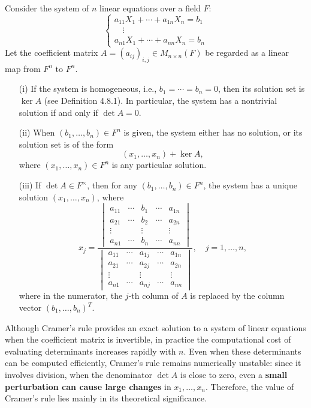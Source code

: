 \begin{corollary}
Consider the system of $n$ linear equations over a field $F$:
\[
\begin{cases}
a_{11} X_1 + \cdots + a_{1n} X_n = b_1 \\
\quad\vdots \\
a_{n1} X_1 + \cdots + a_{nn} X_n = b_n
\end{cases}
\]
Let the coefficient matrix $A = (a_{ij})_{i,j} \in M_{n \times n}(F)$ be regarded as a linear map from $F^n$ to $F^n$.
\begin{itemize}
    \item[(i)] If the system is homogeneous, i.e., $b_1 = \cdots = b_n = 0$, then its solution set is $\ker A$ (see Definition 4.8.1). In particular, the system has a nontrivial solution if and only if $\det A = 0$.
    \item[(ii)] When $(b_1, \ldots, b_n) \in F^n$ is given, the system either has no solution, or its solution set is of the form
    \[
    (x_1, \ldots, x_n) + \ker A,
    \]
    where $(x_1, \ldots, x_n) \in F^n$ is any particular solution.
    \item[(iii)] If $\det A \in F^\times$, then for any $(b_1, \ldots, b_n) \in F^n$, the system has a unique solution $(x_1, \ldots, x_n)$, where
    \[
    x_j = \frac{
    \begin{vmatrix}
    a_{11} & \cdots & b_1 & \cdots & a_{1n} \\
    a_{21} & \cdots & b_2 & \cdots & a_{2n} \\
    \vdots &        & \vdots &        & \vdots \\
    a_{n1} & \cdots & b_n & \cdots & a_{nn}
    \end{vmatrix}
    }{
    \begin{vmatrix}
    a_{11} & \cdots & a_{1j} & \cdots & a_{1n} \\
    a_{21} & \cdots & a_{2j} & \cdots & a_{2n} \\
    \vdots &        & \vdots &        & \vdots \\
    a_{n1} & \cdots & a_{nj} & \cdots & a_{nn}
    \end{vmatrix}
    }, \quad j = 1, \ldots, n,
    \]
    where in the numerator, the $j$-th column of $A$ is replaced by the column vector $(b_1, \ldots, b_n)^T$.
\end{itemize}
\end{corollary}

\begin{note}
Although Cramer's rule provides an exact solution to a system of linear equations when the coefficient matrix is invertible, in practice the computational cost of evaluating determinants increases rapidly with $n$. Even when these determinants can be computed efficiently, Cramer's rule remains numerically unstable: since it involves division, when the denominator $\det A$ is close to zero, even a \textbf{small perturbation can cause large changes} in $x_1, \ldots, x_n$. Therefore, the value of Cramer's rule lies mainly in its theoretical significance.
\end{note}
